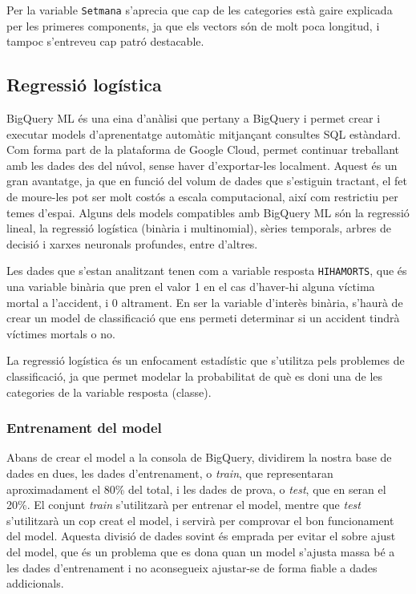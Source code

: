 \documentclass[11pt,longbibliography]{article}
\theoremstyle{definition}
\theoremstyle{remark}
\begin{document}
Per la variable \texttt{Setmana} s'aprecia que cap de les categories està gaire explicada per les primeres components, ja que els vectors són de molt poca longitud, i tampoc s'entreveu cap patró destacable.

\subsection{Regressió logística}

BigQuery ML és una eina d'anàlisi que pertany a BigQuery i permet crear i executar models d'aprenentatge automàtic mitjançant consultes SQL estàndard. Com forma part de la plataforma de Google Cloud, permet continuar treballant amb les dades des del núvol, sense haver d'exportar-les localment. Aquest és un gran avantatge, ja que en funció del volum de dades que s'estiguin tractant, el fet de moure-les pot ser molt costós a escala computacional, així com restrictiu per temes d'espai. Alguns dels models compatibles amb BigQuery ML són la regressió lineal, la regressió logística (binària i multinomial), sèries temporals, arbres de decisió i xarxes neuronals profundes, entre d'altres.


Les dades que s'estan analitzant tenen com a variable resposta \texttt{HIHAMORTS}, que és una variable binària que pren el valor 1 en el cas d'haver-hi alguna víctima mortal a l'accident, i 0 altrament. En ser la variable d'interès binària, s'haurà de crear un model de classificació que ens permeti determinar si un accident tindrà víctimes mortals o no. 


La regressió logística és un enfocament estadístic que s'utilitza pels problemes de classificació, ja que permet modelar la probabilitat de què es doni una de les categories de la variable resposta (classe).


\subsubsection{Entrenament del model}

Abans de crear el model a la consola de BigQuery, dividirem la nostra base de dades en dues, les dades d'entrenament, o \emph{train}, que representaran aproximadament el 80\% del total, i les dades de prova, o \emph{test}, que en seran el 20\%. El conjunt \emph{train} s'utilitzarà per entrenar el model, mentre que \emph{test} s'utilitzarà un cop creat el model, i servirà per comprovar el bon funcionament del model. Aquesta divisió de dades sovint és emprada per evitar el sobre ajust del model, que és un problema que es dona quan un model s'ajusta massa bé a les dades d'entrenament i no aconsegueix ajustar-se de forma fiable a dades addicionals.
\end{document}
